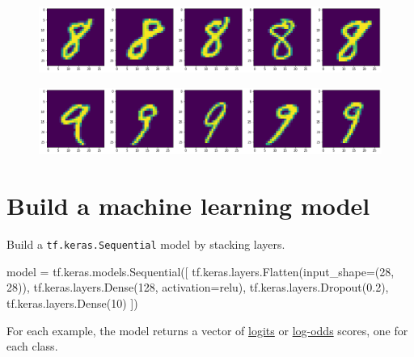 \documentclass[
  letterpaper,
  DIV=11,
  numbers=noendperiod]{scrreprt}
\newenvironment{Shaded}{\begin{snugshade}}{\end{snugshade}}
\newcommand{\DecValTok}[1]{\textcolor[rgb]{0.68,0.00,0.00}{#1}}
\newcommand{\FloatTok}[1]{\textcolor[rgb]{0.68,0.00,0.00}{#1}}
\newcommand{\NormalTok}[1]{\textcolor[rgb]{0.00,0.23,0.31}{#1}}
\newcommand{\OperatorTok}[1]{\textcolor[rgb]{0.37,0.37,0.37}{#1}}
\newcommand{\StringTok}[1]{\textcolor[rgb]{0.13,0.47,0.30}{#1}}
\begin{document}
\begin{figure}[H]

{\centering \includegraphics{notebooks/W10. Machine Learning_files/figure-pdf/cell-5-output-9.png}

}

\end{figure}

\begin{figure}[H]

{\centering \includegraphics{notebooks/W10. Machine Learning_files/figure-pdf/cell-5-output-10.png}

}

\end{figure}

\hypertarget{build-a-machine-learning-model}{%
\section{Build a machine learning
model}\label{build-a-machine-learning-model}}

Build a \texttt{tf.keras.Sequential} model by stacking layers.

\begin{Shaded}
\begin{Highlighting}[]
\NormalTok{model }\OperatorTok{=}\NormalTok{ tf.keras.models.Sequential([}
\NormalTok{  tf.keras.layers.Flatten(input\_shape}\OperatorTok{=}\NormalTok{(}\DecValTok{28}\NormalTok{, }\DecValTok{28}\NormalTok{)),}
\NormalTok{  tf.keras.layers.Dense(}\DecValTok{128}\NormalTok{, activation}\OperatorTok{=}\StringTok{\textquotesingle{}relu\textquotesingle{}}\NormalTok{),}
\NormalTok{  tf.keras.layers.Dropout(}\FloatTok{0.2}\NormalTok{),}
\NormalTok{  tf.keras.layers.Dense(}\DecValTok{10}\NormalTok{)}
\NormalTok{])}
\end{Highlighting}
\end{Shaded}

For each example, the model returns a vector of
\href{https://developers.google.com/machine-learning/glossary\#logits}{logits}
or
\href{https://developers.google.com/machine-learning/glossary\#log-odds}{log-odds}
scores, one for each class.
\end{document}
